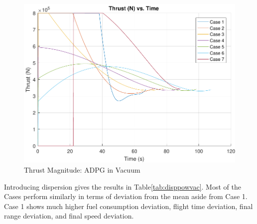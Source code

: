 \begin{figure}[H]
	\centering
	\begin{minipage}{4.5 in}
		\includegraphics[width=\linewidth]{Figures/thrpowvac.pdf}
		\caption{Thrust Magnitude: ADPG in Vacuum \label{fig:thrpowvac} }
	\end{minipage}
\end{figure}

Introducing dispersion gives the results in Table\:\ref{tab:disppowvac}. Most of the Cases perform similarly in terms of deviation from the mean aside from Case 1. Case 1 shows much higher fuel consumption deviation, flight time deviation, final range deviation, and final speed deviation. 

